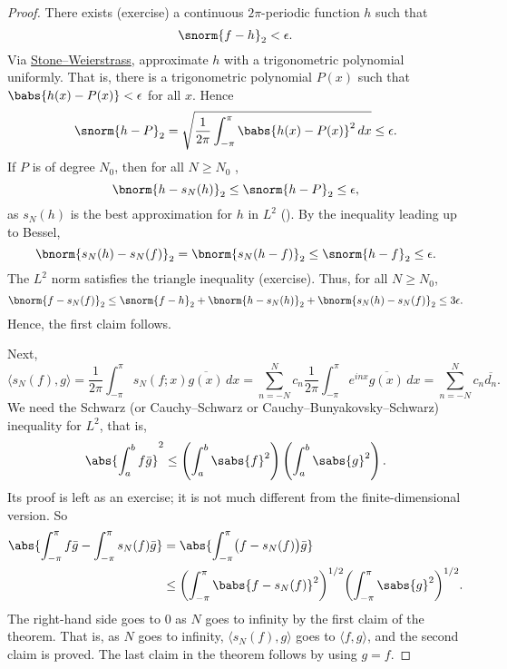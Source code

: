 \begin{proof}
There exists (exercise)
a continuous $2\pi$-periodic function $h$ such that
\begin{equation*}
\snorm{f-h}_2 < \epsilon .
\end{equation*}
Via \hyperref[thm:SWcomplex]{Stone--Weierstrass},
approximate $h$ with a trigonometric polynomial
uniformly.  That is, there is a trigonometric polynomial $P(x)$
such that
$\babs{h(x) - P(x)} < \epsilon$ for all $x$.
Hence
\begin{equation*}
\snorm{h-P}_2
=
\sqrt{
\frac{1}{2\pi}
\int_{-\pi}^{\pi}
\babs{h(x)-P(x)}^2
\,
dx
}
\leq \epsilon.
\end{equation*}
If $P$ is of degree $N_0$, then for all $N \geq N_0$ ,
\begin{equation*}
\bnorm{h-s_N(h)}_2 \leq \snorm{h-P}_2 \leq \epsilon ,
\end{equation*}
as $s_N(h)$ is the best approximation for $h$ in $L^2$ ().
By the inequality leading up to Bessel,
\begin{equation*}
\bnorm{s_N(h)-s_N(f)}_2
=
\bnorm{s_N(h-f)}_2
\leq
\snorm{h-f}_2 \leq \epsilon .
\end{equation*}
The $L^2$ norm satisfies the triangle inequality (exercise).
Thus, for all $N \geq N_0$,
\begin{equation*}
\bnorm{f-s_N(f)}_2
\leq
\snorm{f-h}_2
+
\bnorm{h-s_N(h)}_2
+
\bnorm{s_N(h)-s_N(f)}_2
\leq 3\epsilon .
\end{equation*}
Hence, the first claim follows.

Next,
\begin{equation*}
\langle s_N(f) , g \rangle
=
\frac{1}{2\pi}
\int_{-\pi}^\pi
s_N(f;x) \overline{g(x)} \, dx
=
\sum_{n=-N}^N
c_n 
\frac{1}{2\pi}
\int_{-\pi}^\pi
e^{inx}
\overline{g(x)} \, dx
=
\sum_{n=-N}^N
c_n 
\overline{d_n} .
\end{equation*}
We need the Schwarz (or Cauchy--Schwarz or Cauchy--Bunyakovsky--Schwarz)
inequality for $L^2$, that is,
\begin{equation*}
{\abs{\int_a^b f\bar{g}}}^2
\leq
\left( \int_a^b \sabs{f}^2 \right)
\left( \int_a^b \sabs{g}^2 \right) .
\end{equation*}
Its proof is left as an exercise; it is not much
different from the finite-dimensional version.
So
\begin{equation*}
\begin{split}
\abs{\int_{-\pi}^\pi f\bar{g} - \int_{-\pi}^\pi s_N(f)\bar{g}}
& =
\abs{\int_{-\pi}^\pi \bigl(f- s_N(f)\bigr)\bar{g}} \\
& \leq
{\left(\int_{-\pi}^\pi \babs{f- s_N(f)}^2 \right)}^{1/2}
{\left( \int_{-\pi}^\pi \sabs{g}^2 \right)}^{1/2} .
\end{split}
\end{equation*}
The right-hand side goes to 0 as $N$ goes to infinity by the first
claim of the theorem.
That is, as $N$ goes to infinity, $\langle s_N(f),g \rangle$
goes to $\langle f,g \rangle$, and
the second claim is proved.  The last claim in the theorem follows by using
$g=f$.
\end{proof}

